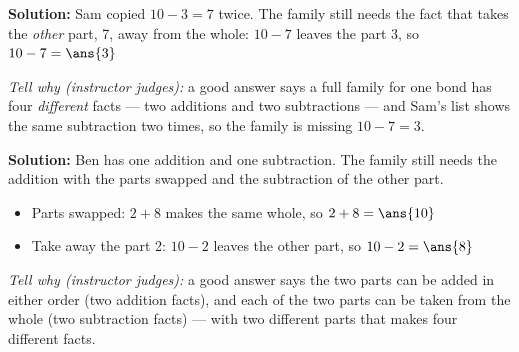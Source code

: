 \documentclass[12pt]{article}
\begin{document}

\textbf{Solution:} Sam copied $10-3=7$ twice. The family still needs the fact
that takes the \emph{other} part, 7, away from the whole:
$10 - 7$ leaves the part 3, so $10 - 7 = \ans{3}$

\emph{Tell why (instructor judges):} a good answer says a full family for one
bond has four \emph{different} facts --- two additions and two subtractions ---
and Sam's list shows the same subtraction two times, so the family is missing
$10-7=3$.


\textbf{Solution:} Ben has one addition and one subtraction. The family still
needs the addition with the parts swapped and the subtraction of the other
part.
\begin{itemize}[leftmargin=1.4cm, itemsep=2pt]
  \item Parts swapped: $2 + 8$ makes the same whole, so $2 + 8 = \ans{10}$
  \item Take away the part 2: $10 - 2$ leaves the other part, so
        $10 - 2 = \ans{8}$
\end{itemize}

\emph{Tell why (instructor judges):} a good answer says the two parts can be
added in either order (two addition facts), and each of the two parts can be
taken from the whole (two subtraction facts) --- with two different parts
that makes four different facts.
\end{document}
